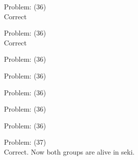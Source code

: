 \documentclass[11pt]{article}
\begin{document}
\begin{minipage}[t]{0.5\textwidth}
  {\centering
  
  Problem: (36)\\
  Correct\\
  }
\end{minipage}
\begin{minipage}[t]{0.5\textwidth}
  {\centering
  
  Problem: (36)\\
  Correct\\
  }
\end{minipage}
\begin{minipage}[t]{0.5\textwidth}
  {\centering
  
  Problem: (36)\\
  
  }
\end{minipage}
\begin{minipage}[t]{0.5\textwidth}
  {\centering
  
  Problem: (36)\\
  
  }
\end{minipage}
\begin{minipage}[t]{0.5\textwidth}
  {\centering
  
  Problem: (36)\\
  
  }
\end{minipage}
\begin{minipage}[t]{0.5\textwidth}
  {\centering
  
  Problem: (36)\\
  
  }
\end{minipage}
\begin{minipage}[t]{0.5\textwidth}
  {\centering
  
  Problem: (36)\\
  
  }
\end{minipage}
\begin{minipage}[t]{0.5\textwidth}
  {\centering
  
  Problem: (37)\\
  Correct. Now both groups are alive in seki.\\
  }
\end{minipage}
\end{document}
